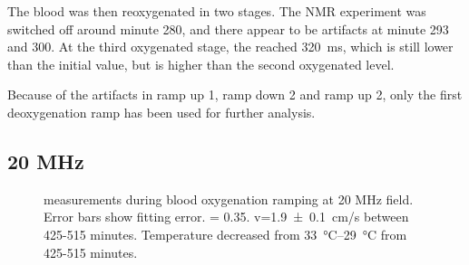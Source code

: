 The blood was then reoxygenated in two stages.
The NMR experiment was switched off around minute 280, and there appear to be artifacts at minute 293 and 300.
At the third oxygenated stage, the \Ttwo reached \SI{320}{ms}, which is still lower than the initial value, but is higher than the second oxygenated level.

Because of the artifacts in ramp up 1, ramp down 2 and ramp up 2, only the first deoxygenation ramp has been used for further analysis.

\subsection{20 MHz}
\begin{figure}[tph]
\centering
{}



\caption[\Ttwo measurements during blood oxygenation ramping at 20 MHz field]{\Ttwo measurements during blood oxygenation ramping at 20 MHz field. Error bars show \Ttwo fitting error. \Hct = 0.35. v=\SI{1.9\pm0.1}{cm/s} between  425-515 minutes. Temperature decreased from \SIrange{33}{29}{\celsius} from 425-515 minutes.}
\label{fig:contflow-20mhzT2Time}
\end{figure}

